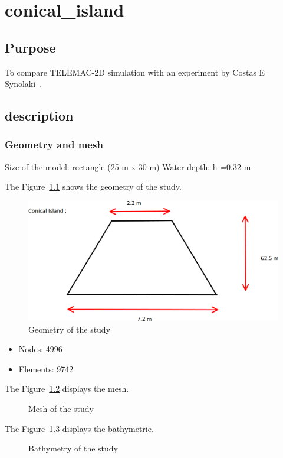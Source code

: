 \chapter{conical\_island}

\section{Purpose}

To compare TELEMAC-2D simulation with an experiment by Costas E Synolaki~\cite{Costas2007}.


\section{description}

\subsection{Geometry and mesh}

Size of the model: rectangle (25 m x 30 m)
Water depth: h =0.32 m

The Figure~\ref{fig:island:geometry} shows the geometry of the study.
\begin{figure}
\centering
\includegraphics[width=.6\textwidth]{img/geometry.png}
\caption{Geometry of the study}\label{fig:island:geometry}
\end{figure}

\begin{itemize}
\item Nodes: 4996
\item Elements: 9742
\end{itemize}

The Figure~\ref{fig:island:mesh} displays the mesh.
\begin{figure}
\centering
{}
\caption{Mesh of the study}\label{fig:island:mesh}
\end{figure}

The Figure~\ref{fig:island:bathy} displays the bathymetrie.
\begin{figure}
\centering
{}
\caption{Bathymetry of the study}\label{fig:island:bathy}
\end{figure}


